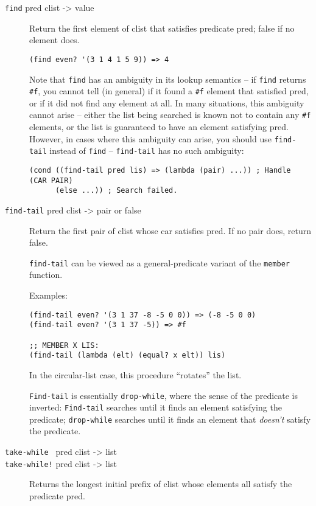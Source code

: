 \begin{description}
\item[ \href{}{} \texttt{find} pred clist -\textgreater{} value ]
Return the first element of clist that satisfies predicate pred; false
if no element does.

\begin{verbatim}
(find even? '(3 1 4 1 5 9)) => 4
\end{verbatim}

Note that \texttt{find} has an ambiguity in its lookup semantics -- if
\texttt{find} returns \texttt{\#f}, you cannot tell (in general) if it
found a \texttt{\#f} element that satisfied pred, or if it did not find
any element at all. In many situations, this ambiguity cannot arise --
either the list being searched is known not to contain any \texttt{\#f}
elements, or the list is guaranteed to have an element satisfying pred.
However, in cases where this ambiguity can arise, you should use
\texttt{find-tail} instead of \texttt{find} -- \texttt{find-tail} has no
such ambiguity:

\begin{verbatim}
(cond ((find-tail pred lis) => (lambda (pair) ...)) ; Handle (CAR PAIR)
      (else ...)) ; Search failed.
\end{verbatim}
\item[ \href{}{} \texttt{find-tail} pred clist -\textgreater{} pair or
false ]
Return the first pair of clist whose car satisfies pred. If no pair
does, return false.

\texttt{find-tail} can be viewed as a general-predicate variant of the
\texttt{member} function.

Examples:

\begin{verbatim}
(find-tail even? '(3 1 37 -8 -5 0 0)) => (-8 -5 0 0)
(find-tail even? '(3 1 37 -5)) => #f

;; MEMBER X LIS:
(find-tail (lambda (elt) (equal? x elt)) lis)
\end{verbatim}

In the circular-list case, this procedure ``rotates'' the list.

\texttt{Find-tail} is essentially \texttt{drop-while}, where the sense
of the predicate is inverted: \texttt{Find-tail} searches until it finds
an element satisfying the predicate; \texttt{drop-while} searches until
it finds an element that \emph{doesn't} satisfy the predicate.
\item[ \href{}{} \texttt{take-while~} pred clist -\textgreater{} list\\
\href{}{} \texttt{take-while!} pred clist -\textgreater{} list ]
Returns the longest initial prefix of clist whose elements all satisfy
the predicate pred.


\end{description}
